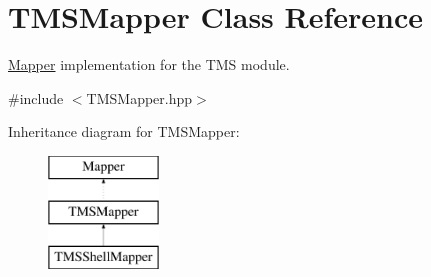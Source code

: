 \hypertarget{classTMSMapper}{
\section{TMSMapper Class Reference}
\label{classTMSMapper}
}


\hyperlink{classMapper}{Mapper} implementation for the TMS module.  




{\ttfamily \#include $<$TMSMapper.hpp$>$}

Inheritance diagram for TMSMapper:\begin{figure}[H]
\begin{center}
\leavevmode
\includegraphics[height=3.000000cm]{classTMSMapper}
\end{center}
\end{figure}
